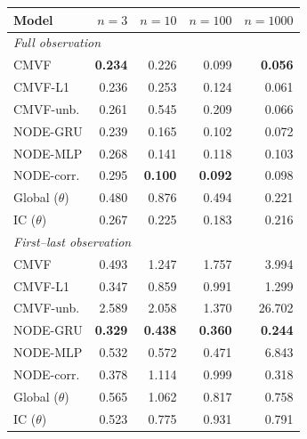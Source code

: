 \begin{tabular}{lrrrr}
\toprule
Model & $n{=}3$ & $n{=}10$ & $n{=}100$ & $n{=}1000$ \\
\midrule
\multicolumn{5}{l}{\emph{Full observation}} \\
CMVF & \textbf{0.234} & 0.226 & 0.099 & \textbf{0.056} \\
CMVF-L1 & 0.236 & 0.253 & 0.124 & 0.061 \\
CMVF-unb. & 0.261 & 0.545 & 0.209 & 0.066 \\
NODE-GRU & 0.239 & 0.165 & 0.102 & 0.072 \\
NODE-MLP & 0.268 & 0.141 & 0.118 & 0.103 \\
NODE-corr. & 0.295 & \textbf{0.100} & \textbf{0.092} & 0.098 \\
Global ($\theta$) & 0.480 & 0.876 & 0.494 & 0.221 \\
IC ($\theta$) & 0.267 & 0.225 & 0.183 & 0.216 \\
\midrule
\multicolumn{5}{l}{\emph{First--last observation}} \\
CMVF & 0.493 & 1.247 & 1.757 & 3.994 \\
CMVF-L1 & 0.347 & 0.859 & 0.991 & 1.299 \\
CMVF-unb. & 2.589 & 2.058 & 1.370 & 26.702 \\
NODE-GRU & \textbf{0.329} & \textbf{0.438} & \textbf{0.360} & \textbf{0.244} \\
NODE-MLP & 0.532 & 0.572 & 0.471 & 6.843 \\
NODE-corr. & 0.378 & 1.114 & 0.999 & 0.318 \\
Global ($\theta$) & 0.565 & 1.062 & 0.817 & 0.758 \\
IC ($\theta$) & 0.523 & 0.775 & 0.931 & 0.791 \\
\bottomrule
\end{tabular}
